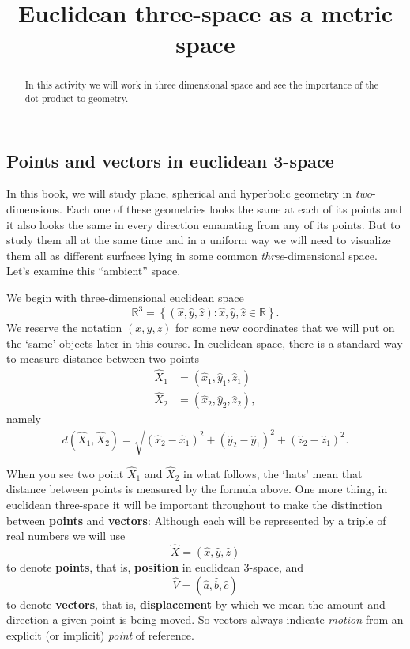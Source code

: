 \documentclass{ximera}
\title{Euclidean three-space as a metric space}
\begin{document}
\begin{abstract}
In this activity we will work in three dimensional space and see the
importance of the dot product to geometry.
\end{abstract}
\maketitle

\subsection*{Points and vectors in euclidean 3-space}

In this book, we will study plane, spherical and hyperbolic geometry
in \textit{two}-dimensions. Each one of these geometries looks the
same at each of its points and it also looks the same in every
direction emanating from any of its points. But to study them all at
the same time and in a uniform way we will need to visualize them all
as different surfaces lying in some common \textit{three}-dimensional
space. Let's examine this ``ambient'' space.

We begin with three-dimensional euclidean space
\[
\mathbb{R}^{3}=\left\{  \left(  \hat{x},\hat{y},\hat{z}\right)  :\hat{x}%
,\hat{y},\hat{z}\in\mathbb{R}\right\}.
\]
We reserve the notation $\left( x,y,z\right) $ for some new
coordinates that we will put on the `same' objects later in this
course. In euclidean space, there is a standard way to measure
distance between two points%
\begin{align*}
\hat{X}_{1}  &  =\left(  \hat{x}_{1},\hat{y}_{1},\hat{z}_{1}\right) \\
\hat{X}_{2}  &  =\left(  \hat{x}_{2},\hat{y}_{2},\hat{z}_{2}\right)  ,
\end{align*}
namely%
\[
d\left(  \hat{X}_{1},\hat{X}_{2}\right)  =\sqrt{\left(  \hat{x}_{2}-\hat
{x}_{1}\right)  ^{2}+\left(  \hat{y}_{2}-\hat{y}_{1}\right)  ^{2}+\left(
\hat{z}_{2}-\hat{z}_{1}\right)  ^{2}}. \label{0}%
\]

When you see two point $\hat{X}_1$ and $\hat{X}_2$ in what follows,
the `hats' mean that distance between points is measured by the
formula above. One more thing, in euclidean three-space it will be
important throughout to make the distinction between \textbf{points}
and \textbf{vectors}: Although each will be represented by a triple of
real numbers we will use%
\[
\hat{X}=\left(  \hat{x},\hat{y},\hat{z}\right)
\]
to denote \textbf{points}, that is, \textbf{position} in euclidean $3$-space,
and%
\[
\hat{V}=\left(  \hat{a},\hat{b},\hat{c}\right)
\]
to denote \textbf{vectors}, that is, \textbf{displacement} by which we mean
the amount and direction a given point is being moved. So vectors always
indicate \textit{motion} from an explicit (or implicit) \textit{point} of
reference. 
\end{document}
